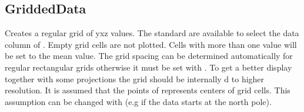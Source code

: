 \subsection{GriddedData}
Creates a regular grid of yxz values. The standard 
are available to select the data column of .
Empty grid cells are not plotted. Cells with more than one value will be set to the mean value.
The grid spacing can be determined automatically for regular rectangular grids otherwise
it must be set with . To get a better display together with some projections
the grid should be internally d to higher resolution.
It is assumed that the points of  represents centers of grid cells.
This assumption can be changed with  (e.g if the data starts at the north pole).


